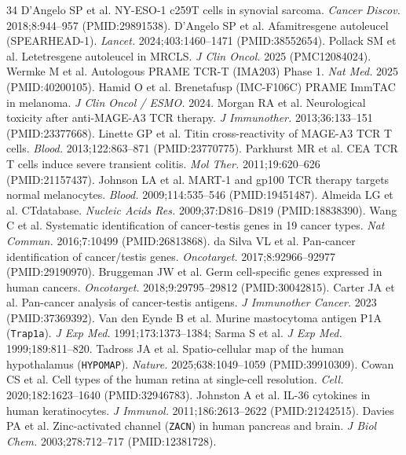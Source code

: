 \documentclass[10pt,letterpaper]{article}
\begin{document}
\small
\begin{thebibliography}{34}\setlength{\itemsep}{1pt}
 D'Angelo SP et al. NY-ESO-1 c259T cells in synovial sarcoma. \emph{Cancer Discov.} 2018;8:944--957 (PMID:29891538).
 D'Angelo SP et al. Afamitresgene autoleucel (SPEARHEAD-1). \emph{Lancet.} 2024;403:1460--1471 (PMID:38552654).
 Pollack SM et al. Letetresgene autoleucel in MRCLS. \emph{J Clin Oncol.} 2025 (PMC12084024).
 Wermke M et al. Autologous PRAME TCR-T (IMA203) Phase 1. \emph{Nat Med.} 2025 (PMID:40200105).
 Hamid O et al. Brenetafusp (IMC-F106C) PRAME ImmTAC in melanoma. \emph{J Clin Oncol / ESMO.} 2024.
 Morgan RA et al. Neurological toxicity after anti-MAGE-A3 TCR therapy. \emph{J Immunother.} 2013;36:133--151 (PMID:23377668).
 Linette GP et al. Titin cross-reactivity of MAGE-A3 TCR T cells. \emph{Blood.} 2013;122:863--871 (PMID:23770775).
 Parkhurst MR et al. CEA TCR T cells induce severe transient colitis. \emph{Mol Ther.} 2011;19:620--626 (PMID:21157437).
 Johnson LA et al. MART-1 and gp100 TCR therapy targets normal melanocytes. \emph{Blood.} 2009;114:535--546 (PMID:19451487).
 Almeida LG et al. CTdatabase. \emph{Nucleic Acids Res.} 2009;37:D816--D819 (PMID:18838390).
 Wang C et al. Systematic identification of cancer-testis genes in 19 cancer types. \emph{Nat Commun.} 2016;7:10499 (PMID:26813868).
 da Silva VL et al. Pan-cancer identification of cancer/testis genes. \emph{Oncotarget.} 2017;8:92966--92977 (PMID:29190970).
 Bruggeman JW et al. Germ cell-specific genes expressed in human cancers. \emph{Oncotarget.} 2018;9:29795--29812 (PMID:30042815).
 Carter JA et al. Pan-cancer analysis of cancer-testis antigens. \emph{J Immunother Cancer.} 2023 (PMID:37369392).
 Van den Eynde B et al. Murine mastocytoma antigen P1A (\texttt{Trap1a}). \emph{J Exp Med.} 1991;173:1373--1384; Sarma S et al. \emph{J Exp Med.} 1999;189:811--820.
 Tadross JA et al. Spatio-cellular map of the human hypothalamus (\texttt{HYPOMAP}). \emph{Nature.} 2025;638:1049--1059 (PMID:39910309).
 Cowan CS et al. Cell types of the human retina at single-cell resolution. \emph{Cell.} 2020;182:1623--1640 (PMID:32946783).
 Johnston A et al. IL-36 cytokines in human keratinocytes. \emph{J Immunol.} 2011;186:2613--2622 (PMID:21242515).
 Davies PA et al. Zinc-activated channel (\texttt{ZACN}) in human pancreas and brain. \emph{J Biol Chem.} 2003;278:712--717 (PMID:12381728).

\end{thebibliography}
\end{document}
